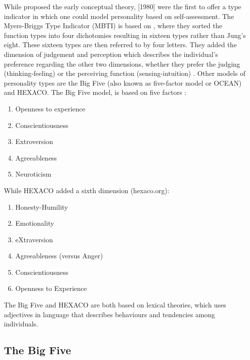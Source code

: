 While \cite{Jung1923} proposed the early conceptual theory, \cite{Myers2010}[1980]  were the first to offer a type indicator in which one could model personality based on self-assessment. The Myers-Briggs Type Indicator (MBTI) is based on \cite{Jung1923}, where they sorted the function types into four dichotomies resulting in sixteen types rather than Jung's eight. These sixteen types are then referred to by four letters. They added the dimension of judgement and perception which describes the individual's preference regarding the other two dimensions, whether they prefer the judging (thinking-feeling) or the perceiving function (sensing-intuition) \citep{Myers2010}. Other models of personality types are the Big Five (also known as five-factor model or OCEAN) and HEXACO. The Big Five model, is based on five factors \citep{toegel2012}:

\begin{enumerate}
    \item Openness to experience
    \item Conscientiousness
    \item Extroversion
    \item Agreeableness
    \item Neuroticism 
\end{enumerate}

While HEXACO added a sixth dimension (hexaco.org):
\begin{enumerate}
    \item Honesty-Humility
    \item Emotionality
    \item eXtraversion
    \item Agreeableness (versus Anger)
    \item Conscientiousness
    \item Openness to Experience
\end{enumerate}

The Big Five and HEXACO are both based on lexical theories, which uses adjectives in language that describes behaviours and tendencies among individuals. 

\vspace{5mm} %

\subsection{The Big Five}

